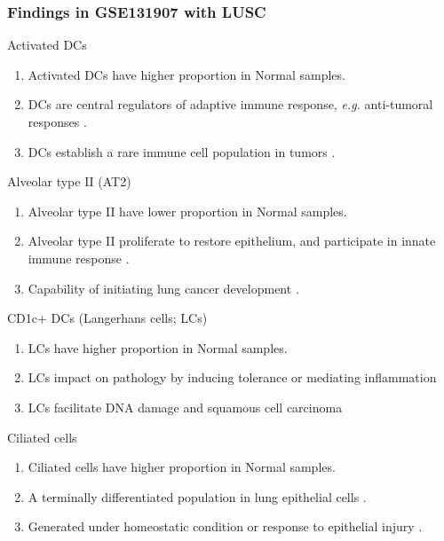 \documentclass{beamer}
\begin{document}
    \begin{frame}[allowframebreaks]
        \frametitle{Findings in GSE131907 with LUSC}

        \begin{block}{Activated DCs}
            \begin{enumerate}
                \item Activated DCs have higher proportion in Normal samples.
                \item DCs are central regulators of adaptive immune response, \textit{e.g.} anti-tumoral responses .
                \item DCs establish a rare immune cell population in tumors .
            \end{enumerate}
        \end{block}

        \begin{block}{Alveolar type II (AT2)}
            \begin{enumerate}
                \item Alveolar type II have lower proportion in Normal samples.
                \item Alveolar type II proliferate to restore epithelium, and participate in innate immune response \cite{ATII-1}.
                \item Capability of initiating lung cancer development \cite{ATII-2}.
            \end{enumerate}
        \end{block}

        \begin{block}{CD1c+ DCs (Langerhans cells; LCs)}
            \begin{enumerate}
                \item LCs have higher proportion in Normal samples.
                \item LCs impact on pathology by inducing tolerance or mediating inflammation \cite{LCs-1}
                \item LCs facilitate DNA damage and squamous cell carcinoma \cite{LCs-2}
            \end{enumerate}
        \end{block}

        \begin{block}{Ciliated cells}
            \begin{enumerate}
                \item Ciliated cells have higher proportion in Normal samples.
                \item A terminally differentiated population in lung epithelial cells \cite{ciliated-1}.
                \item Generated under homeostatic condition or response to epithelial injury \cite{ciliated-2}.
            \end{enumerate}
        \end{block}


\end{frame}
\end{document}
